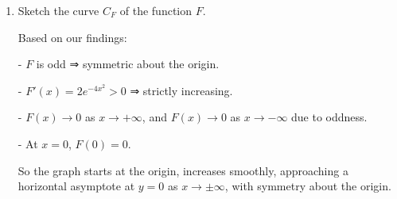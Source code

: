 \documentclass[12pt]{article}
\begin{document}
\begin{answerbox}
\begin{enumerate}
    \item Sketch the curve $ C_F $ of the function $ F $.

    Based on our findings:
    
        
- $ F $ is odd ⇒ symmetric about the origin.
        
- $ F'(x) = 2e^{-4x^2} > 0 $ ⇒ strictly increasing.
        
- $ F(x) \to 0 $ as $ x \to +\infty $, and $ F(x) \to 0 $ as $ x \to -\infty $ due to oddness.
        
- At $ x = 0 $, $ F(0) = 0 $.
    

    So the graph starts at the origin, increases smoothly, approaching a horizontal asymptote at $ y = 0 $ as $ x \to \pm\infty $, with symmetry about the origin.

\end{enumerate}
\end{answerbox}

\end{document}
